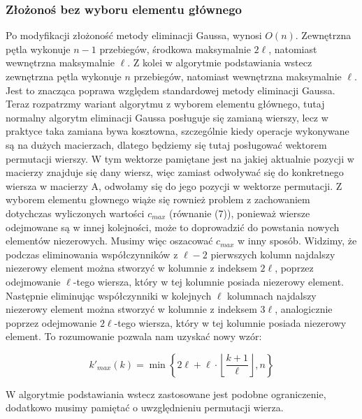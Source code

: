 \documentclass[12pt, a4paper]{article}
\begin{document}
\subsubsection*{Złożonoś bez wyboru elementu głównego}
Po modyfikacji złożoność metody eliminacji Gaussa, wynosi $O(n)$. Zewnętrzna pętla wykonuje $n-1$ przebiegów, środkowa maksymalnie $2\ell$, natomiast wewnętrzna maksymalnie $\ell$. Z kolei w algorytmie podstawiania wstecz zewnętrzna pętla wykonuje $n$ przebiegów, natomiast wewnętrzna maksymalnie $\ell$. Jest to znacząca poprawa względem standardowej metody eliminacji Gaussa.\\

\noindent Teraz rozpatrzmy wariant algorytmu z wyborem elementu głównego, tutaj normalny algorytm eliminacji Gaussa posługuje się zamianą wierszy, lecz w praktyce taka zamiana bywa kosztowna, szczególnie kiedy operacje wykonywane są na dużych macierzach, dlatego będziemy się tutaj posługować wektorem permutacji wierszy. W tym wektorze pamiętane jest na jakiej aktualnie pozycji w macierzy znajduje się dany wiersz, więc zamiast odwoływać się do konkretnego wiersza w macierzy A, odwołamy się do jego pozycji w wektorze permutacji. Z wyborem elementu głownego wiąże się rownież problem z zachowaniem dotychczas wyliczonych wartości $c_{max}$ (równanie (7)), ponieważ wiersze odejmowane są w innej kolejności, może to doprowadzić do  powstania nowych elementów niezerowych. Musimy więc oszacować $c_{max}$ w inny sposób. Widzimy, że podczas eliminowania współczynników z $\ell - 2$ pierwszych kolumn najdalszy niezerowy element można stworzyć w kolumnie z indeksem $2\ell$, poprzez odejmowanie $\ell$-tego wiersza, który w tej kolumnie posiada niezerowy element.
Następnie eliminując współczynniki w kolejnych $\ell$ kolumnach najdalszy niezerowy element można stworzyć w kolumnie z indeksem $3\ell$, analogicznie poprzez odejmowanie $2\ell$-tego wiersza, który w tej kolumnie posiada niezerowy element. To rozumowanie pozwala nam uzyskać nowy wzór:


\begin{equation}
k'_{max}(k) = \min\left\lbrace2\ell + \ell \cdot \left \lfloor\frac{k + 1}{\ell}\right \rfloor, n\right\rbrace
\end{equation}



\noindent W algorytmie podstawiania wstecz zastosowane jest podobne ograniczenie, dodatkowo musimy pamiętać o uwzględnieniu permutacji wierza.\\
\end{document}
